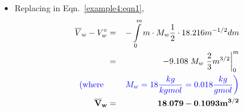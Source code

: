 \documentclass[12pts,a4paper,amsmath,amssymb,floatfix]{article}%
\newcommand{\frc}{\displaystyle\frac}
\newcommand{\blue}{\textcolor{blue}}
\begin{document}
\begin{enumerate}[label=\bfseries Example \arabic*]
\begin{itemize}
  \item Replacing in Eqn.~\ref{example4:eqn1}, 
      \begin{eqnarray}
         \overline{V}_{w} - V_{w}^{\circ} &=& -\int\limits_{0}^{m} m\cdot M_{w} \frc{1}{2}\cdot 18.216 m^{-1/2} dm \nonumber \\
                                       &=& -9.108\; M_{w} \left. \frc{2}{3} m^{3/2}\right|_{0}^{m} \nonumber \\
         \blue{\left(\text{where }\right.}&& \blue{\left. M_{w} = 18 \frc{kg}{kgmol} = 0.018 \frc{kg}{gmol}\right)} \nonumber \\
         {\bf \overline{V}_{w}} &=& {\bf 18.079 - 0.1093 m^{3/2}} \nonumber 
      \end{eqnarray}



\end{itemize}

\end{enumerate} 

%
\end{document}
